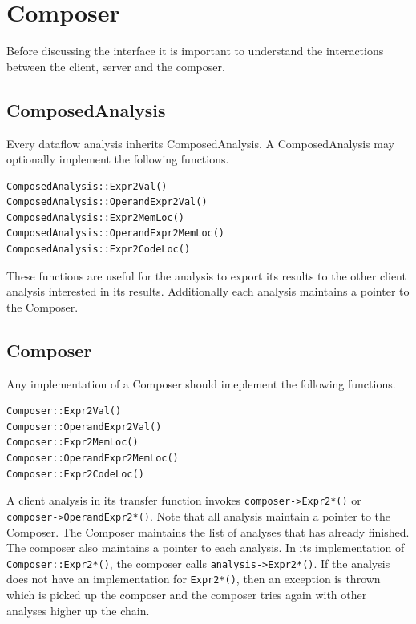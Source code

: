\documentclass{article}
\begin{document}
\section{Composer}
\label{sec:composer}
Before discussing the interface it is important to understand the interactions between the client, server and the composer. 

\subsection{ComposedAnalysis}
Every dataflow analysis inherits ComposedAnalysis. A ComposedAnalysis may optionally implement the following functions.
\lstset{
label=code:composed-analysis-interface,
caption=Composed Analysis Interface
}
\begin{lstlisting}
ComposedAnalysis::Expr2Val()
ComposedAnalysis::OperandExpr2Val()
ComposedAnalysis::Expr2MemLoc()
ComposedAnalysis::OperandExpr2MemLoc()
ComposedAnalysis::Expr2CodeLoc()
\end{lstlisting}
These functions are useful for the analysis to export its results to the other client analysis interested in its results. Additionally each analysis maintains a pointer to the Composer.

\lstset{
label=code:composer-interface,
caption=Composer Interface
}
\subsection{Composer}
Any implementation of a Composer should imeplement the following functions.
\begin{lstlisting}
Composer::Expr2Val()
Composer::OperandExpr2Val()
Composer::Expr2MemLoc()
Composer::OperandExpr2MemLoc()
Composer::Expr2CodeLoc()
\end{lstlisting}

A client analysis in its transfer function invokes \texttt{composer->Expr2*()} or \texttt{composer->OperandExpr2*()}. Note that all analysis maintain a pointer to the Composer. The Composer maintains the list of analyses that has already finished. The composer also maintains a pointer to each analysis. In its implementation of \texttt{Composer::Expr2*()}, the composer calls \texttt{analysis->Expr2*()}. If the analysis does not have an implementation for \texttt{Expr2*()}, then an exception is thrown which is picked up the composer and the composer tries again with other analyses higher up the chain. 
\end{document}
